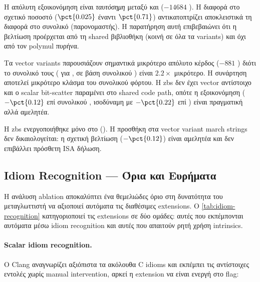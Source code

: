 Η απόλυτη εξοικονόμηση είναι \emph{ταυτόσημη} μεταξύ 
και  ($-\num{14684}$ \instret). Η διαφορά στο σχετικό
ποσοστό ($\pct{0.025}$ έναντι $\pct{0.71}$) αντικατοπτρίζει αποκλειστικά
τη διαφορά στο συνολικό \instret (παρονομαστής). Η παρατήρηση αυτή
επιβεβαιώνει ότι η βελτίωση προέρχεται από τη shared 
βιβλιοθήκη (κοινή σε όλα τα variants) και όχι από τον polymul πυρήνα.

Τα vector variants παρουσιάζουν σημαντικά μικρότερο απόλυτο κέρδος
($-\num{881}$ \instret) διότι το συνολικό τους \instret
( για , σε βάση συνολικού \KEM) είναι $2.2\times$ μικρότερο.
Η συνάρτηση  αποτελεί μικρότερο
κλάσμα του συνολικού φόρτου. Η \gls{zbs} δεν έχει vector αντίστοιχο και
ο scalar bit-scatter παραμένει στο shared code path, οπότε η εξοικονόμηση
($-\pct{0.12}$ επί συνολικού \KEM, ισοδύναμη με $-\pct{0.22}$ επί \Decaps) είναι πραγματική αλλά αμελητέα.

Η \gls{zbs} ενεργοποιήθηκε μόνο στο 
(). Η προσθήκη στα vector variant march
strings δεν δικαιολογείται: η σχετική βελτίωση ($-\pct{0.12}$) είναι
αμελητέα και δεν επιβάλλει πρόσθετη ISA δήλωση.

\subsection{Idiom Recognition — Όρια και Ευρήματα}
\label{ssec:ablation-idiom-recognition}

Η ανάλυση ablation αποκαλύπτει ένα θεμελιώδες όριο στη δυνατότητα του
μεταγλωττιστή να αξιοποιεί αυτόματα τις διαθέσιμες extensions. Ο
\cref{tab:idiom-recognition} κατηγοριοποιεί τις extensions σε δύο ομάδες:
αυτές που εκπέμπονται αυτόματα μέσω idiom recognition
και αυτές που απαιτούν ρητή χρήση intrinsics.

\begin{table}[htbp]
  \centering
  \caption{Όριο idiom recognition: ο μεταγλωττιστής (Clang~21.1.1, )
    αναγνωρίζει αυτόματα scalar idioms αλλά δεν συνθέτει vector crypto
    primitives από generic C. Η στήλη  δηλώνει εάν η εντολή
    εκπέμπεται χωρίς ρητή παρέμβαση του προγραμματιστή.}
  \label{tab:idiom-recognition}
  \small
  
\end{table}

\paragraph{Scalar idiom recognition.}
Ο Clang αναγνωρίζει αξιόπιστα τα ακόλουθα C idioms και εκπέμπει τις
αντίστοιχες εντολές χωρίς manual intervention, αρκεί η extension να
είναι ενεργή στο  flag:


